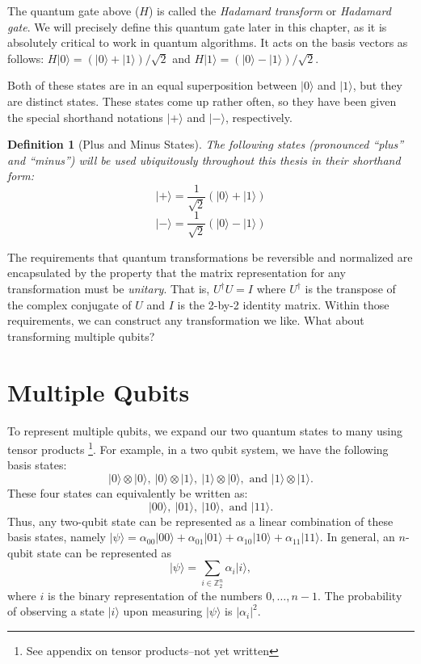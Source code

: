 \documentclass[12pt,twoside]{reedthesis}
\newtheorem{definition}{Definition}
\newcommand{\Z}{\mathbb{Z}}
\newcommand{\ketz}{\ensuremath{\lvert 0\rangle}\xspace}
\newcommand{\keto}{\ensuremath{\lvert 1\rangle}\xspace}
\newcommand{\ket}[1]{\ensuremath{\lvert #1\rangle}\xspace}
\newcommand{\Hplus}{\ensuremath{\lvert + \rangle}\xspace}
\newcommand{\Hminus}{\ensuremath{\lvert- \rangle}\xspace}
\begin{document}
The quantum gate above ($H$) is called the \textit{Hadamard transform} or \textit{Hadamard gate}. We will precisely define this quantum gate later in this chapter, as it is absolutely critical to work in quantum algorithms. It acts on the basis vectors as follows: $H\ketz = (\ketz + \keto)/\sqrt{2}$ and $H\keto = (\ketz - \keto)/\sqrt{2}$. 

Both of these states are in an equal superposition between \ketz and \keto, but they are distinct states. These states come up rather often, so they have been given the special shorthand notations \Hplus and \Hminus, respectively. 

\begin{definition}[Plus and Minus States] The following states (pronounced ``plus'' and ``minus'') will be used ubiquitously throughout this thesis in their shorthand form:
$$\Hplus = \frac{1}{\sqrt{2}}(\ketz + \keto)$$
$$\Hminus = \frac{1}{\sqrt{2}}(\ketz - \keto)$$
\end{definition}
The requirements that quantum transformations be reversible and normalized are encapsulated by the property that the matrix representation for any transformation must be \textit{unitary}. That is, $U^{\dagger} U = I$ where $U^{\dagger}$ is the transpose of the complex conjugate of $U$ and $I$ is the 2-by-2 identity matrix. Within those requirements, we can construct any transformation we like. What about transforming multiple qubits?

\section{Multiple Qubits}

To represent multiple qubits, we expand our two quantum states to many using tensor products \footnote{See appendix on tensor products--not yet written}. For example, in a two qubit system, we have the following basis states:
$$ \ketz \otimes \ketz,~\ketz \otimes \keto,~\keto \otimes \ketz, \text{ and } \keto \otimes \keto.$$ 
These four states can equivalently be written as:
$$ \ket{00},~\ket{01},~\ket{10}, \text{ and } \ket{11}.$$
Thus, any two-qubit state can be represented as a linear combination of these basis states, namely $\ket{\psi} = \alpha_{00}\ket{00}+ \alpha_{01}\ket{01} + \alpha_{10}\ket{10} + \alpha_{11}\ket{11}.$ In general, an $n$-qubit state can be represented as 
\begin{equation*}
\ket{\psi} = \sum_{i \in \Z_2^n} \alpha_{i}\ket{i},
\end{equation*}
where $i$ is the binary representation of the numbers $0, \ldots, n-1.$ The probability of observing a state \ket{i} upon measuring \ket{\psi} is $\lvert \alpha_{i} \rvert ^2.$ 
\end{document}

